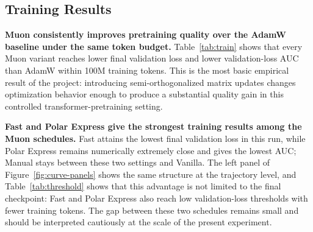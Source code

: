 \documentclass[10pt]{article}
\begin{document}
\subsection{Training Results}
\textbf{Muon consistently improves pretraining quality over the AdamW baseline under the same token budget.} Table~\ref{tab:train} shows that every Muon variant reaches lower final validation loss and lower validation-loss AUC than AdamW within 100M training tokens. This is the most basic empirical result of the project: introducing semi-orthogonalized matrix updates changes optimization behavior enough to produce a substantial quality gain in this controlled transformer-pretraining setting.

\textbf{Fast and Polar Express give the strongest training results among the Muon schedules.} Fast attains the lowest final validation loss in this run, while Polar Express remains numerically extremely close and gives the lowest AUC; Manual stays between these two settings and Vanilla. The left panel of Figure~\ref{fig:curve-panels} shows the same structure at the trajectory level, and Table~\ref{tab:threshold} shows that this advantage is not limited to the final checkpoint: Fast and Polar Express also reach low validation-loss thresholds with fewer training tokens. The gap between these two schedules remains small and should be interpreted cautiously at the scale of the present experiment.
\end{document}
